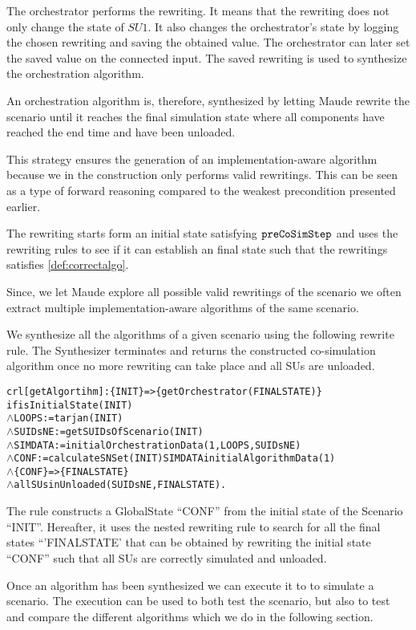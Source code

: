 The orchestrator performs the rewriting. 
It means that the rewriting does not only change the state of $SU1$.
It also changes the orchestrator's state by logging the chosen rewriting and saving the obtained value.
The orchestrator can later set the saved value on the connected input.
The saved rewriting is used to synthesize the orchestration algorithm. 

An orchestration algorithm is, therefore, synthesized by letting Maude rewrite the scenario until it reaches the final simulation state where all components have reached the end time and have been unloaded.

This strategy ensures the generation of an implementation-aware algorithm because we in the construction only performs valid rewritings.
This can be seen as a type of forward reasoning compared to the weakest precondition presented earlier.

The rewriting starts form an initial state satisfying $\mathtt{preCoSimStep}$ and uses the rewriting rules to see if it can establish an final state such that the rewritings satisfies \cref{def:correctalgo}.

Since, we let Maude explore all possible valid rewritings of the scenario we often extract multiple implementation-aware algorithms of the same scenario.

We synthesize all the algorithms of a given scenario using the following rewrite rule.
The Synthesizer terminates and returns the constructed co-simulation algorithm once no more rewriting can take place and all SUs are unloaded.

\begin{alltt}
  \small
crl [getAlgortihm]: \{ INIT \} => \{ getOrchestrator(FINALSTATE) \}
if isInitialState(INIT)
  \(\land\) LOOPS := tarjan(INIT)
  \(\land\) SUIDsNE := getSUIDsOfScenario(INIT)
  \(\land\) SIMDATA := initialOrchestrationData(1,LOOPS,SUIDsNE)
  \(\land\) CONF := calculateSNSet(INIT) SIMDATA initialAlgorithmData(1)
  \(\land\) \{CONF\} => \{ FINALSTATE\} 
  \(\land\) allSUsinUnloaded(SUIDsNE, FINALSTATE) .
\end{alltt}


The rule constructs a GlobalState ``CONF'' from the initial state of the Scenario ``INIT''.
Hereafter, it uses the nested  rewriting rule to search for all the final states ``'FINALSTATE' that can be obtained by rewriting the initial state ``CONF'' such that all SUs are correctly simulated and unloaded.

Once an algorithm has been synthesized we can execute it to to simulate a scenario.
The execution can be used to both test the scenario, but also to test and compare the different algorithms which we do in the following section.

